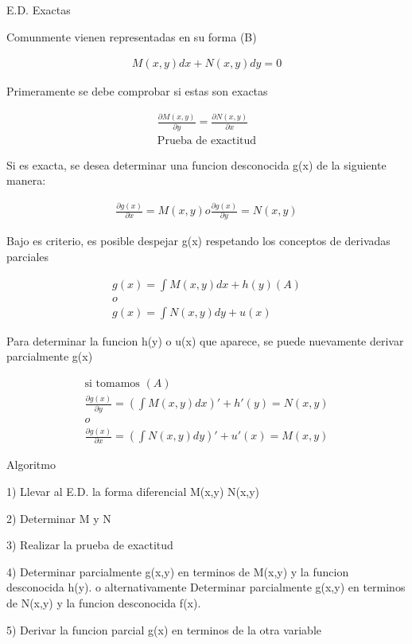 \documentclass{article}
\begin{document}
E.D. Exactas

Comunmente vienen representadas en su forma (B)


\begin{gather*}
M(x,y)dx+N(x,y)dy = 0
\end{gather*}


Primeramente se debe comprobar si estas son exactas


\begin{gather*}
\frac{\partial M(x,y)}{\partial y} = \frac{\partial N(x,y)}{\partial x}  \\
\text{Prueba de exactitud}
\end{gather*}


Si es exacta, se desea determinar una funcion desconocida g(x) de la siguiente manera:


\begin{gather*}
\frac{\partial g(x)}{\partial x} =M(x,y)  o   \frac{\partial g(x)}{\partial y} =N(x,y) 
\end{gather*}


Bajo es criterio, es posible despejar g(x) respetando los conceptos de derivadas parciales


\begin{gather*}
g(x) =\int M(x,y)dx +h(y)  (A) \\
o \\
g(x) =\int N(x,y)dy +u(x)
\end{gather*}


Para determinar la funcion h(y) o u(x) que aparece, se puede nuevamente derivar parcialmente g(x)


\begin{gather*}
\text{si tomamos }(A) \\
\frac{\partial g(x)}{\partial y} =(\int M(x,y)dx)' +h'(y)  =N(x,y) \\
o \\
\frac{\partial g(x)}{\partial x} =(\int N(x,y)dy)' +u'(x)  =M(x,y)
\end{gather*}


Algoritmo

1) Llevar al E.D.  la forma diferencial M(x,y) N(x,y)

2) Determinar M y N

3) Realizar la prueba de exactitud

4) Determinar parcialmente g(x,y) en terminos de M(x,y) y la funcion desconocida h(y). o alternativamente Determinar parcialmente g(x,y) en terminos de N(x,y) y la funcion desconocida f(x).

5) Derivar la funcion  parcial g(x) en terminos de la otra variable
\end{document}
